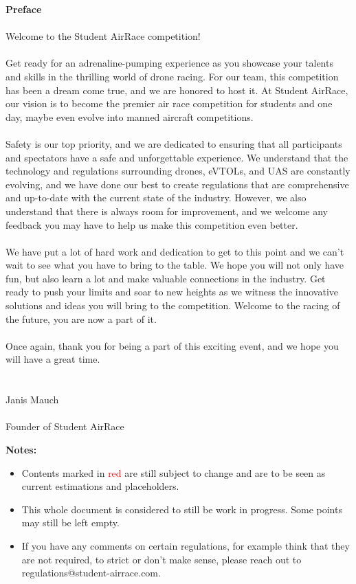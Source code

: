 \documentclass{article}
\begin{document}
\newpage
{\bf Preface}
\\ \\ Welcome to the Student AirRace competition! \\ \\
Get ready for an adrenaline-pumping experience as you showcase your talents and skills in the thrilling world of drone racing. 
For our team, this competition has been a dream come true, and we are honored to host it. 
At Student AirRace, our vision is to become the premier air race competition for students and one day, maybe even evolve into manned aircraft competitions.
\\ \\ 
Safety is our top priority, and we are dedicated to ensuring that all participants and spectators have a safe and unforgettable experience. 
We understand that the technology and regulations surrounding drones, eVTOLs, and UAS are constantly evolving, and we have done our best to create regulations that are comprehensive and up-to-date with the current state of the industry. 
However, we also understand that there is always room for improvement, and we welcome any feedback you may have to help us make this competition even better.
\\ \\ 
We have put a lot of hard work and dedication to get to this point and we can't wait to see what you have to bring to the table. 
We hope you will not only have fun, but also learn a lot and make valuable connections in the industry. 
Get ready to push your limits and soar to new heights as we witness the innovative solutions and ideas you will bring to the competition. 
Welcome to the racing of the future, you are now a part of it.
\\ \\ 
Once again, thank you for being a part of this exciting event, and we hope you will have a great time.
\\ \\ \\
Janis Mauch 
\\ \\Founder of Student AirRace


\newpage
{\bf Notes:
\begin{itemize}
  \item Contents marked in \textcolor{red}{red} are still subject to change and are to be seen as current estimations and placeholders.
  \item This whole document is considered to still be work in progress. Some points may still be left empty.
  \item If you have any comments on certain regulations, for example think that they are not required, to strict or don't make sense, please reach out to regulations@student-airrace.com.
\end{itemize}
}
\end{document}
